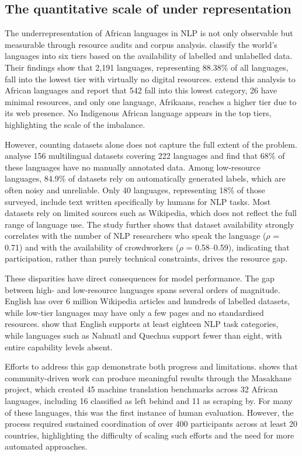 \documentclass[11pt,a4paper]{article}
\begin{document}
\subsection{The quantitative scale of under representation}
The underrepresentation of African languages in NLP is not only observable but measurable through resource audits and corpus analysis. \citet{joshi2020state} classify the world’s languages into six tiers based on the availability of labelled and unlabelled data. Their findings show that 2,191 languages, representing 88.38\% of all languages, fall into the lowest tier with virtually no digital resources. \citet{adebara2022towards} extend this analysis to African languages and report that 542 fall into this lowest category, 26 have minimal resources, and only one language, Afrikaans, reaches a higher tier due to its web presence. No Indigenous African language appears in the top tiers, highlighting the scale of the imbalance.

However, counting datasets alone does not capture the full extent of the problem. \citet{yu2022beyond} analyse 156 multilingual datasets covering 222 languages and find that 68\% of these languages have no manually annotated data. Among low-resource languages, 84.9\% of datasets rely on automatically generated labels, which are often noisy and unreliable. Only 40 languages, representing 18\% of those surveyed, include text written specifically by humans for NLP tasks. Most datasets rely on limited sources such as Wikipedia, which does not reflect the full range of language use. The study further shows that dataset availability strongly correlates with the number of NLP researchers who speak the language ($\rho$ = 0.71) and with the availability of crowdworkers ($\rho$ = 0.58–0.59), indicating that participation, rather than purely technical constraints, drives the resource gap.

These disparities have direct consequences for model performance. The gap between high- and low-resource languages spans several orders of magnitude. English has over 6 million Wikipedia articles and hundreds of labelled datasets, while low-tier languages may have only a few pages and no standardised resources. \citet{hedderich2021survey} show that English supports at least eighteen NLP task categories, while languages such as Nahuatl and Quechua support fewer than eight, with entire capability levels absent.

Efforts to address this gap demonstrate both progress and limitations. \citet{nekoto2020participatory} shows that community-driven work can produce meaningful results through the Masakhane project, which created 45 machine translation benchmarks across 32 African languages, including 16 classified as left behind and 11 as scraping by. For many of these languages, this was the first instance of human evaluation. However, the process required sustained coordination of over 400 participants across at least 20 countries, highlighting the difficulty of scaling such efforts and the need for more automated approaches.
\end{document}
